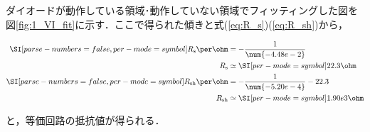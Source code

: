 \documentclass[1_power_supply.tex]{subfiles}
\begin{document}
ダイオードが動作している領域･動作していない領域でフィッティングした図を図\ref{fig:1_VI_fit}に示す．ここで得られた傾きと式(\ref{eq:R_s})(\ref{eq:R_sh})から，

\begin{align}
	\SIeq{R_\mathrm{s}}{\per\ohm}  & = -\frac{1}{\num{-4.48e-2}}      \\
	R_\mathrm{s}                   & \simeq \SIs{22.3}{\ohm}          \\
	\SIeq{R_\mathrm{sh}}{\per\ohm} & = -\frac{1}{\num{-5.20e-4}}-22.3 \\
	R_\mathrm{sh}                  & \simeq \SIs{1.90e3}{\ohm}
\end{align}

と，等価回路の抵抗値が得られる．
\end{document}
